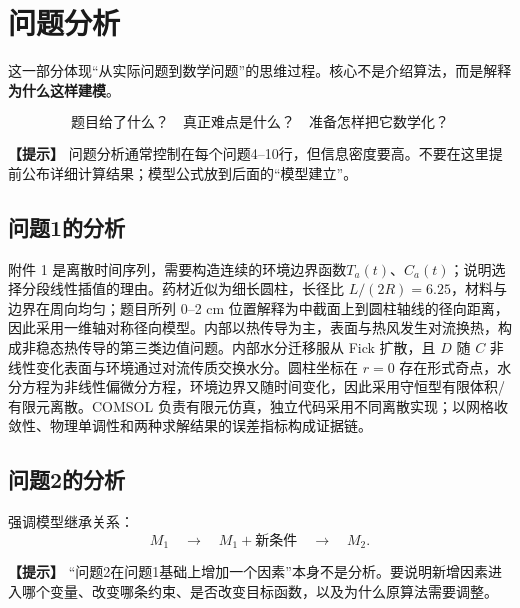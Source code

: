 \documentclass[12pt,a4paper]{article}
\newcommand{\tip}[1]{\par\noindent\textbf{【提示】} #1\par}
\newcommand{\good}[1]{\par\noindent\textbf{【推荐写法】} #1\par}
\begin{document}
\section{问题分析}

这一部分体现“从实际问题到数学问题”的思维过程。核心不是介绍算法，而是解释\textbf{为什么这样建模}。

\[
\boxed{\text{题目给了什么？}\quad\text{真正难点是什么？}\quad\text{准备怎样把它数学化？}}
\]

\tip{问题分析通常控制在每个问题4--10行，但信息密度要高。不要在这里提前公布详细计算结果；模型公式放到后面的“模型建立”。}

\subsection{问题1的分析}

附件 1 是离散时间序列，需要构造连续的环境边界函数$T_a(t)$、$C_a(t)$；说明选择分段线性插值的理由。药材近似为细长圆柱，长径比 $L/(2R)=6.25$，材料与边界在周向均匀；题目所列 0--2 cm 位置解释为中截面上到圆柱轴线的径向距离，因此采用一维轴对称径向模型。内部以热传导为主，表面与热风发生对流换热，构成非稳态热传导的第三类边值问题。内部水分迁移服从 Fick 扩散，且 $D$ 随 $C$ 非线性变化表面与环境通过对流传质交换水分。圆柱坐标在 $r=0$ 存在形式奇点，水分方程为非线性偏微分方程，环境边界又随时间变化，因此采用守恒型有限体积/有限元离散。COMSOL 负责有限元仿真，独立代码采用不同离散实现；以网格收敛性、物理单调性和两种求解结果的误差指标构成证据链。



\subsection{问题2的分析}

强调模型继承关系：
\[
M_1\quad\longrightarrow\quad M_1+\text{新条件}\quad\longrightarrow\quad M_2.
\]

\tip{“问题2在问题1基础上增加一个因素”本身不是分析。要说明新增因素进入哪个变量、改变哪条约束、是否改变目标函数，以及为什么原算法需要调整。}
\end{document}
